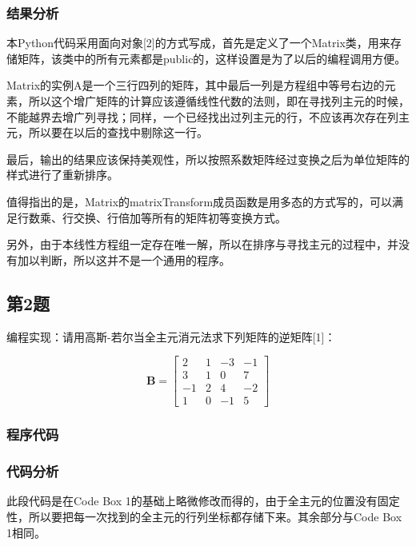 \subsubsection{结果分析}

本Python代码采用面向对象[2]的方式写成，首先是定义了一个Matrix类，用来存储矩阵，该类中的所有元素都是public的，这样设置是为了以后的编程调用方便。

Matrix的实例A是一个三行四列的矩阵，其中最后一列是方程组中等号右边的元素，所以这个增广矩阵的计算应该遵循线性代数的法则，即在寻找列主元的时候，不能越界去增广列寻找；同样，一个已经找出过列主元的行，不应该再次存在列主元，所以要在以后的查找中剔除这一行。

最后，输出的结果应该保持美观性，所以按照系数矩阵经过变换之后为单位矩阵的样式进行了重新排序。

值得指出的是，Matrix的matrixTransform成员函数是用多态的方式写的，可以满足行数乘、行交换、行倍加等所有的矩阵初等变换方式。

另外，由于本线性方程组一定存在唯一解，所以在排序与寻找主元的过程中，并没有加以判断，所以这并不是一个通用的程序。

\subsection{第2题}

编程实现：请用高斯-若尔当全主元消元法求下列矩阵的逆矩阵[1]：

\begin{equation}
    \mathbf{B} = \left[\begin{array}{rrrr}
        {2} & {1} & {-3} & {-1} \\
        {3} & {1} & {0} & {7} \\
        {-1} & {2} & {4} & {-2} \\
        {1} & {0} & {-1} & {5}
    \end{array}\right]
\end{equation}

\subsubsection{程序代码}


\subsubsection{代码分析}
此段代码是在Code Box 1的基础上略微修改而得的，由于全主元的位置没有固定性，所以要把每一次找到的全主元的行列坐标都存储下来。其余部分与Code Box 1相同。

